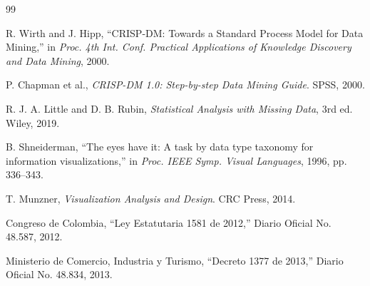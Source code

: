 \documentclass[12pt,a4paper]{article}
\begin{document}
\begin{thebibliography}{99}

R. Wirth and J. Hipp, ``CRISP-DM: Towards a Standard Process Model for Data
Mining,'' in \textit{Proc. 4th Int. Conf. Practical Applications of Knowledge
Discovery and Data Mining}, 2000.

P. Chapman et al., \textit{CRISP-DM 1.0: Step-by-step Data Mining Guide}. SPSS,
2000.

R. J. A. Little and D. B. Rubin, \textit{Statistical Analysis with Missing Data},
3rd ed. Wiley, 2019.

B. Shneiderman, ``The eyes have it: A task by data type taxonomy for information
visualizations,'' in \textit{Proc. IEEE Symp. Visual Languages}, 1996,
pp. 336--343.

T. Munzner, \textit{Visualization Analysis and Design}. CRC Press, 2014.

Congreso de Colombia, ``Ley Estatutaria 1581 de 2012,'' Diario Oficial No. 48.587,
2012.

Ministerio de Comercio, Industria y Turismo, ``Decreto 1377 de 2013,'' Diario
Oficial No. 48.834, 2013.

\end{thebibliography}
\end{document}
